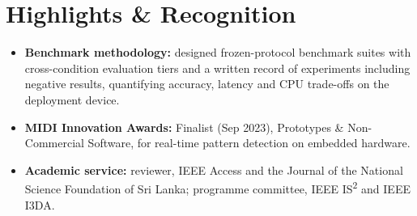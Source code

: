 \documentclass[11pt]{article}
\begin{document}
\enlargethispage{3\baselineskip}
\vspace{-0.5em}
\section*{Highlights \& Recognition}
\begin{itemize}[leftmargin=1.2em, itemsep=-0.25em]
    \item \textbf{Benchmark methodology:} designed frozen-protocol benchmark suites with cross-condition evaluation tiers and a written record of experiments including negative results, quantifying accuracy, latency and CPU trade-offs on the deployment device.
    \item \textbf{MIDI Innovation Awards:} Finalist (Sep 2023), Prototypes \& Non-Commercial Software, for real-time pattern detection on embedded hardware.
    \item \textbf{Academic service:} reviewer, IEEE Access and the Journal of the National Science Foundation of Sri Lanka; programme committee, IEEE IS\textsuperscript{2} and IEEE I3DA.
\end{itemize}
\end{document}
